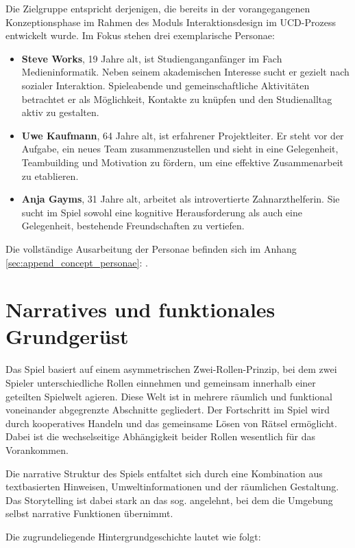 Die Zielgruppe entspricht derjenigen, die bereits in der vorangegangenen Konzeptionsphase im Rahmen des Moduls Interaktionsdesign im \ac{UCD}-Prozess entwickelt wurde. Im Fokus stehen drei exemplarische Personae:

\begin{itemize}
    \item \textbf{Steve Works}, 19 Jahre alt, ist Studienganganfänger im Fach Medieninformatik. Neben seinem akademischen Interesse sucht er gezielt nach sozialer Interaktion. Spieleabende und gemeinschaftliche Aktivitäten betrachtet er als Möglichkeit, Kontakte zu knüpfen und den Studienalltag aktiv zu gestalten.
    \item \textbf{Uwe Kaufmann}, 64 Jahre alt, ist erfahrener Projektleiter. Er steht vor der Aufgabe, ein neues Team zusammenzustellen und sieht in  eine Gelegenheit, Teambuilding und Motivation zu fördern, um eine effektive Zusammenarbeit zu etablieren.
    \item \textbf{Anja Gayms}, 31 Jahre alt, arbeitet als introvertierte Zahnarzthelferin. Sie sucht im Spiel sowohl eine kognitive Herausforderung als auch eine Gelegenheit, bestehende Freundschaften zu vertiefen.
\end{itemize}

Die vollständige Ausarbeitung der Personae befinden sich im Anhang \ref{sec:append_concept_personae}: .

\section{Narratives und funktionales Grundgerüst}
Das Spiel basiert auf einem asymmetrischen Zwei-Rollen-Prinzip, bei dem zwei Spieler unterschiedliche Rollen einnehmen und gemeinsam innerhalb einer geteilten Spielwelt agieren. Diese Welt ist in mehrere räumlich und funktional voneinander abgegrenzte Abschnitte gegliedert. Der Fortschritt im Spiel wird durch kooperatives Handeln und das gemeinsame Lösen von Rätsel ermöglicht. Dabei ist die wechselseitige Abhängigkeit beider Rollen wesentlich für das Vorankommen.

Die narrative Struktur des Spiels entfaltet sich durch eine Kombination aus textbasierten Hinweisen, Umweltinformationen und der räumlichen Gestaltung. Das Storytelling ist dabei stark an das sog.  angelehnt, bei dem die Umgebung selbst narrative Funktionen übernimmt.

Die zugrundeliegende Hintergrundgeschichte lautet wie folgt:

